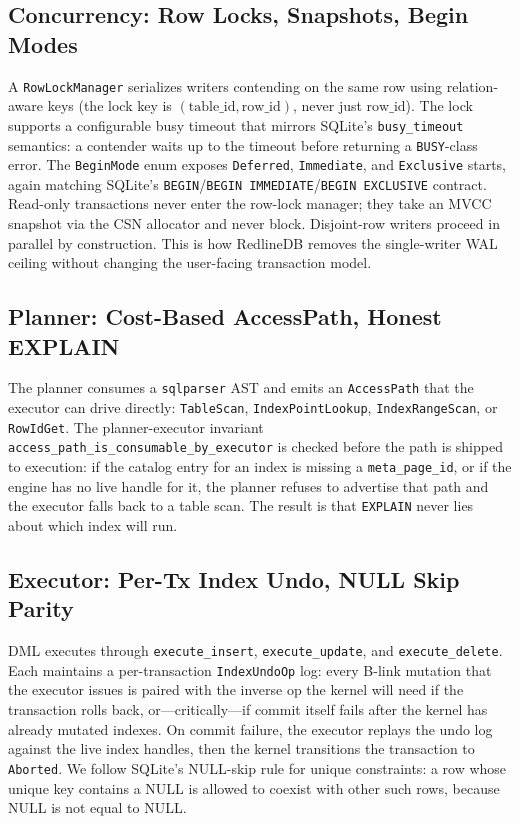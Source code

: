 \subsection{Concurrency: Row Locks, Snapshots, Begin Modes}
A \texttt{RowLockManager} serializes writers contending on the same
row using relation-aware keys (the lock key is
$(\mathrm{table\_id}, \mathrm{row\_id})$, never just $\mathrm{row\_id}$).
The lock supports a configurable busy timeout that mirrors SQLite's
\texttt{busy\_timeout} semantics: a contender waits up to the timeout
before returning a \texttt{BUSY}-class error. The
\texttt{BeginMode} enum exposes \texttt{Deferred}, \texttt{Immediate},
and \texttt{Exclusive} starts, again matching SQLite's
\texttt{BEGIN}/\texttt{BEGIN IMMEDIATE}/\texttt{BEGIN EXCLUSIVE}
contract. Read-only transactions never enter the row-lock manager;
they take an MVCC snapshot via the CSN allocator and never block.
Disjoint-row writers proceed in parallel by construction. This is
how RedlineDB removes the single-writer WAL ceiling without changing
the user-facing transaction model.

\subsection{Planner: Cost-Based AccessPath, Honest EXPLAIN}
The planner consumes a \texttt{sqlparser} AST and emits an
\texttt{AccessPath} that the executor can drive directly:
\texttt{TableScan}, \texttt{IndexPointLookup}, \texttt{IndexRangeScan},
or \texttt{RowIdGet}. The planner-executor invariant
\texttt{access\_path\_is\_consumable\_by\_executor} is checked
before the path is shipped to execution: if the catalog entry for an
index is missing a \texttt{meta\_page\_id}, or if the engine has no
live handle for it, the planner refuses to advertise that path and
the executor falls back to a table scan. The result is that
\texttt{EXPLAIN} never lies about which index will run.

\subsection{Executor: Per-Tx Index Undo, NULL Skip Parity}
DML executes through \texttt{execute\_insert}, \texttt{execute\_update},
and \texttt{execute\_delete}. Each maintains a per-transaction
\texttt{IndexUndoOp} log: every B-link mutation that the executor
issues is paired with the inverse op the kernel will need if the
transaction rolls back, or---critically---if commit itself fails after
the kernel has already mutated indexes. On commit failure, the
executor replays the undo log against the live index handles, then
the kernel transitions the transaction to \texttt{Aborted}. We follow
SQLite's NULL-skip rule for unique constraints: a row whose unique
key contains a NULL is allowed to coexist with other such rows,
because NULL is not equal to NULL.

